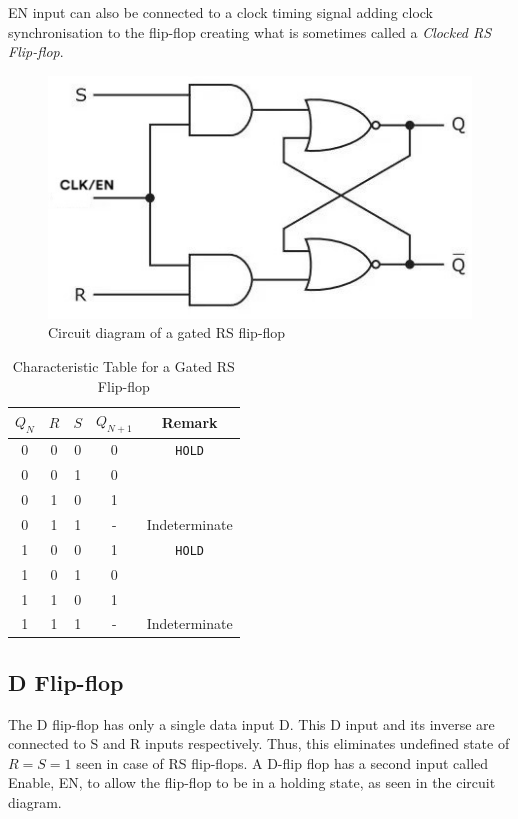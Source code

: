 EN input can also be connected to a clock timing signal adding
clock synchronisation to the flip-flop creating what is sometimes called a
\textit{Clocked RS Flip-flop}.

\begin{figure}[H]
    \centering
    \includegraphics[width=0.60\columnwidth]{images/gatedrs.jpg}
    \caption{Circuit diagram of a gated RS flip-flop}
    \label{2}
\end{figure}

\begin{table}[H]
    \centering
    \begin{tabular}{|c|c|c|c|c|}\hline
        $Q_N$ & $R$ & $S$ & $Q_{N+1}$ & Remark \\ \hline
        0 & 0 & 0 & 0 & \verb|HOLD| \\ 
        0 & 0 & 1 & 0 & \\ 
        0 & 1 & 0 & 1 &\\ 
        0 & 1 & 1 & - &Indeterminate \\ 
        1 & 0 & 0 & 1 &\verb|HOLD|\\ 
        1 & 0 & 1 & 0 &\\ 
        1 & 1 & 0 & 1 &\\
        1 & 1 & 1 & - & Indeterminate \\ \hline
    \end{tabular}
    \caption{Characteristic Table for a Gated RS Flip-flop}
\end{table}
\subsection{D Flip-flop}
The D flip-flop has only a single data input D. This D input and its inverse are connected to S and R inputs respectively. Thus, this eliminates undefined state of $R=S=1$ seen in case of RS flip-flops.
A D-flip flop has a second input called Enable, EN, to allow the flip-flop to
be in a holding state, as seen in the circuit diagram.

